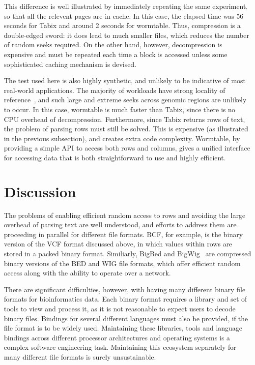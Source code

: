 \documentclass[10pt]{bmc_article}
\newenvironment{bmcformat}{\begin{raggedright}\baselineskip20pt\sloppy\setboolean{publ}{false}}{\end{raggedright}\baselineskip20pt\sloppy}
\begin{document}
\begin{bmcformat}
This difference is well illustrated by immediately repeating 
the same experiment, so that all the relevent pages are 
in cache. In this case, the elapsed time was 56 seconds for Tabix and around 
2 seconds for wormtable. Thus, compression is a double-edged sword: 
it does lead to much smaller files, which reduces the number of random seeks 
required.  On the other hand, however, decompression is expensive and must 
be repeated each time a block is accessed unless some sophisticated
caching mechanism is devised. 

The test used here is also highly synthetic, and unlikely to be 
indicative of most real-world applications. The majority of 
workloads have strong locality of reference~\cite{d05}, 
and such large and extreme seeks across genomic regions 
are unlikely to occur. In this case, wormtable 
is  much faster than Tabix, since there
is no CPU overhead of decompression. Furthermore, since 
Tabix returns rows of text, the problem of parsing rows
must still be solved. This is expensive (as illustrated 
in the previous subsection), and creates extra code 
complexity. Wormtable, by providing a simple API to 
access both rows and columns, gives a 
unified interface for accessing data that is 
both straightforward to use and highly efficient.


\section*{Discussion}
The problems of enabling efficient random access to rows and 
avoiding the large overhead of parsing text are well understood, 
and efforts to address them are proceeding in parallel for 
different file formats. 
BCF, for example, is the binary version of the VCF format discussed 
above, in which values within rows are stored in a packed binary 
format.  Similiarly, BigBed and 
BigWig~\cite{kzbhk10} are compressed binary versions of the BED 
and WIG file formats, which offer efficient random access along 
with the ability to operate over a network. 

There are significant difficulties,
however, with having many different binary file formats for bioinformatics 
data. Each binary format requires a library and set of tools to view 
and process it, as it is not reasonable to expect users to decode binary
files. Bindings for several different languages must also be provided, if 
the file format is to be widely used.
Maintaining these libraries, tools and language bindings across 
different processor architectures and operating systems
is a complex software engineering task. Maintaining this ecosystem 
separately for many different file formats is surely 
unsustainable.


\end{bmcformat}
\end{document}
